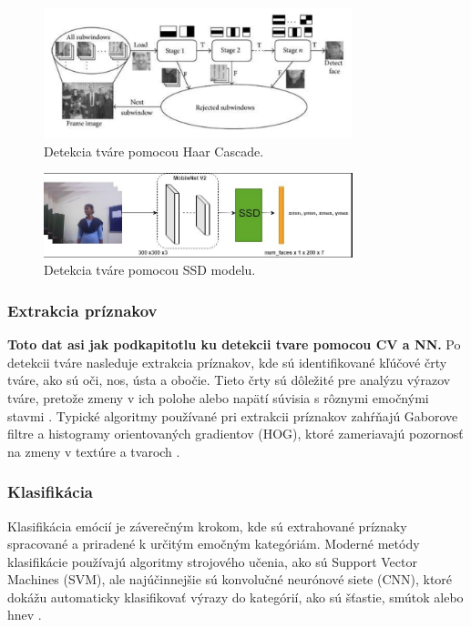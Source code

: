 \begin{figure}[!htpb]
    \centering
    \includegraphics[width=0.8\textwidth]{img/haar_cascade.png}
    \caption{Detekcia tváre pomocou Haar Cascade.} 
    \label{fig:haar_cascade}
\end{figure}

\begin{figure}[!htpb]
    \centering
    \includegraphics[width=0.8\textwidth]{img/ssd_model.png}
    \caption{Detekcia tváre pomocou SSD modelu.} 
    \label{fig:ssd_model}
\end{figure}
\subsubsection{Extrakcia príznakov}
\textbf{Toto dat asi jak podkapitotlu ku detekcii tvare pomocou CV a NN.}
Po detekcii tváre nasleduje extrakcia príznakov, kde sú identifikované kľúčové črty tváre, ako sú oči, nos, ústa a obočie. Tieto črty sú dôležité pre analýzu výrazov tváre, pretože zmeny v ich polohe 
alebo napätí súvisia s rôznymi emočnými stavmi​ \cite{inProceedings01}. Typické algoritmy používané pri extrakcii príznakov zahŕňajú Gaborove filtre a histogramy orientovaných gradientov (HOG), 
ktoré zameriavajú pozornosť na zmeny v textúre a tvaroch​ \cite{article03}.
\subsubsection{Klasifikácia}
Klasifikácia emócií je záverečným krokom, kde sú extrahované príznaky spracované a priradené k určitým emočným kategóriám. Moderné metódy klasifikácie používajú algoritmy strojového učenia, 
ako sú Support Vector Machines (SVM), ale najúčinnejšie sú konvolučné neurónové siete (CNN), ktoré dokážu automaticky klasifikovať výrazy do kategórií, ako sú šťastie, smútok alebo hnev​ \cite{inProceedings01} \cite{article03}.

